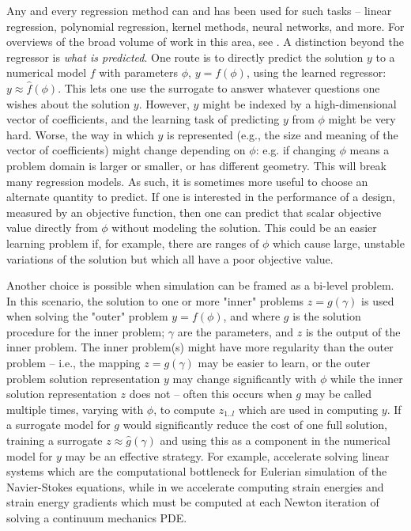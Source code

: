 \documentclass{puthesis}
\begin{document}
Any and every regression method can and has been used for such tasks --
linear regression, polynomial regression, kernel methods, neural networks, and more.
For overviews of the broad volume of work in this area, see \citet{simpson2001metamodels,martin2005use,queipo2005surrogate,
koziel2013surrogate,willard2020integrating}.
A distinction beyond the regressor is \emph{what is predicted}.
One route is to directly predict the solution $y$ to a numerical model $f$ with parameters
$\phi$, $y = f(\phi)$, using the learned regressor: $y \approx \hat{f}(\phi)$.
This lets one use the surrogate to answer whatever questions one wishes about the
solution $y$.
However, $y$ might be indexed by a high-dimensional vector of coefficients, and
the learning task of predicting $y$ from $\phi$ might be very hard.
Worse, the way in which $y$ is represented (e.g., the size and meaning of the vector
of coefficients) might change depending on $\phi$: e.g. if changing $\phi$ means
a problem domain is larger or smaller, or has different geometry.
This will break many regression models.
As such, it is sometimes more useful to choose an alternate quantity to predict.
If one is interested in the performance of a design, measured by an objective function,
then one can predict that scalar objective value directly from $\phi$ without
modeling the solution.
This could be an easier learning problem if, for example, there are ranges of $\phi$
which cause large, unstable variations of the solution but which all have a poor
objective value.

Another choice is possible when simulation can be framed as a bi-level
problem.
In this scenario, the solution to one or more "inner" problems $z = g(\gamma)$
is used when solving the "outer" problem $y = f(\phi)$, and where $g$ is the solution
procedure for the inner problem; $\gamma$ are the parameters, and $z$ is the output
of the inner problem.
The inner problem(s) might have more regularity than the outer problem -- i.e.,
the mapping $z = g(\gamma)$ may be easier to learn, or the outer problem solution
representation $y$ may change significantly with $\phi$ while the inner solution
representation $z$ does not -- often this occurs when $g$ may be called multiple times,
varying with $\phi$, to compute $z_{1..l}$ which are used in computing $y$.
If a surrogate model for $g$ would significantly reduce the cost of one full solution,
training a surrogate $z \approx \hat{g}(\gamma)$ and using this as a component in the
numerical model for $y$ may be an effective strategy.
For example, \citet{tompson2017accelerating} accelerate solving linear systems which
are the computational bottleneck for Eulerian simulation of the Navier-Stokes
equations, while in \citet{beatson2020learning} we accelerate computing strain energies
and strain energy gradients which must be computed at each Newton iteration of solving
a continuum mechanics PDE.
\end{document}

